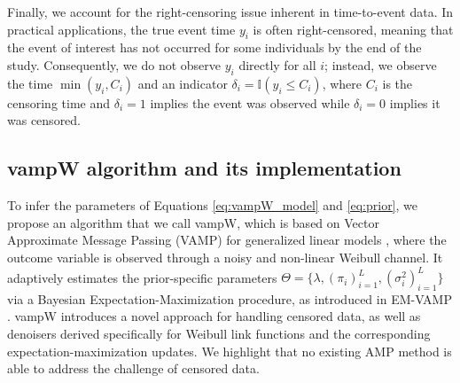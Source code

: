 Finally, we account for the right-censoring issue inherent in time-to-event data. In practical applications, the true event time $y_i$ is often right-censored, meaning that the event of interest has not occurred for some individuals by the end of the study. Consequently, we do not observe $y_i$ directly for all $i$; instead, we observe the time $\min(y_i, C_i)$ and an indicator $\delta_i = \mathbb{I}(y_i \leq C_i)$, where $C_i$ is the censoring time and $\delta_i=1$ implies the event was observed while $\delta_i=0$ implies it was censored.

\subsection{vampW algorithm and its implementation}\label{sec:vampW}

To infer the parameters of Equations \eqref{eq:vampW_model} and \eqref{eq:prior}, we propose an algorithm that we call vampW, which is based on Vector Approximate Message Passing (VAMP) for generalized linear models \cite{rangan_vector_2019, schniter_vector_2016}, where the outcome variable is observed through a noisy and non-linear Weibull channel. It adaptively estimates the prior-specific parameters $\Theta = \{\lambda, (\pi_i)_{i=1}^L, (\sigma_i^2)_{i=1}^L \}$ via a Bayesian Expectation-Maximization procedure, as introduced in EM-VAMP \cite{LearningFreeEnergies2018}. vampW introduces a novel approach for handling censored data, as well as denoisers derived specifically for Weibull link functions and the corresponding expectation-maximization updates. We highlight that no existing AMP method is able to address the challenge of censored data. 

